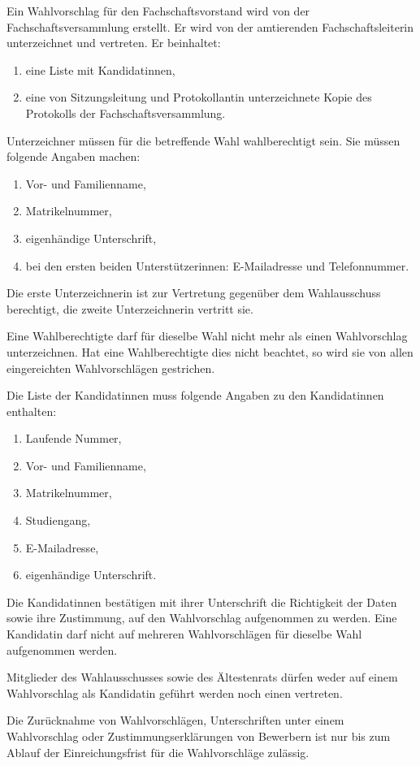 \begin{jurdoc}
Ein Wahlvorschlag für den Fachschaftsvorstand wird von der Fachschaftsversammlung erstellt. Er wird von der amtierenden Fachschaftsleiterin unterzeichnet und vertreten. Er beinhaltet:
\begin{enumerate}
    \item eine Liste mit Kandidatinnen,
    \item eine von Sitzungsleitung und Protokollantin unterzeichnete Kopie des Protokolls der Fachschaftsversammlung.
\end{enumerate}

Unterzeichner müssen für die betreffende Wahl wahlberechtigt sein. Sie müssen folgende Angaben machen:
\begin{enumerate}
\item Vor- und Familienname,
\item Matrikelnummer,
\item eigenhändige Unterschrift,
\item bei den ersten beiden Unterstützerinnen: E-Mailadresse und Telefonnummer.
\end{enumerate}
Die erste Unterzeichnerin ist zur Vertretung gegenüber dem Wahlausschuss berechtigt, die zweite Unterzeichnerin vertritt sie.

Eine Wahlberechtigte darf für dieselbe Wahl nicht mehr als einen Wahlvorschlag unterzeichnen. Hat eine Wahlberechtigte dies nicht beachtet, so wird sie von allen eingereichten Wahlvorschlägen gestrichen.

Die Liste der Kandidatinnen muss folgende Angaben zu den Kandidatinnen enthalten:
\begin{enumerate}
\item Laufende Nummer,
\item Vor- und Familienname,
\item Matrikelnummer,
\item Studiengang,
\item E-Mailadresse,
\item eigenhändige Unterschrift.
\end{enumerate}
Die Kandidatinnen bestätigen mit ihrer Unterschrift die Richtigkeit der Daten sowie ihre Zustimmung, auf den Wahlvorschlag aufgenommen zu werden. Eine Kandidatin darf nicht auf mehreren Wahlvorschlägen für dieselbe Wahl aufgenommen werden.

Mitglieder des Wahlausschusses sowie des Ältestenrats dürfen weder auf einem Wahlvorschlag als Kandidatin geführt werden noch einen vertreten.

Die Zurücknahme von Wahlvorschlägen, Unterschriften unter einem Wahlvorschlag oder Zustimmungserklärungen von Bewerbern ist nur bis zum Ablauf der Einreichungsfrist für die Wahlvorschläge zulässig.


\end{jurdoc}
